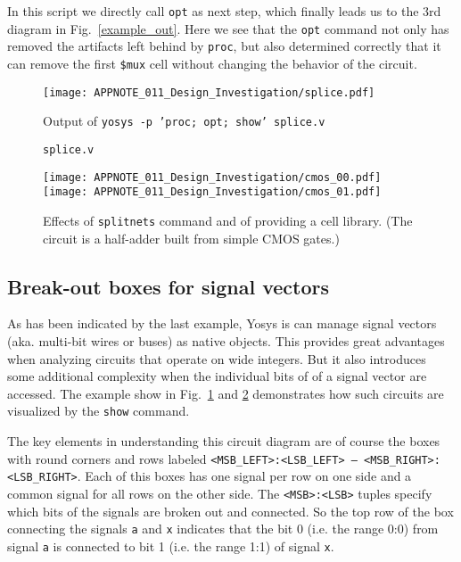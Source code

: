 \documentclass[9pt,technote,a4paper]{IEEEtran}
\begin{document}
\medskip

In this script we directly call {\tt opt} as next step, which finally leads us to
the 3rd diagram in Fig.~\ref{example_out}. Here we see that the {\tt opt} command
not only has removed the artifacts left behind by {\tt proc}, but also determined
correctly that it can remove the first {\tt \$mux} cell without changing the behavior
of the circuit.

\begin{figure}[b!]
\texttt{[image: APPNOTE\_011\_Design\_Investigation/splice.pdf]}
\caption{Output of {\tt yosys -p 'proc; opt; show' splice.v}}
\label{splice_dia}
\end{figure}

\begin{figure}[b!]

\caption{\tt splice.v}
\label{splice_src}
\end{figure}

\begin{figure}[t!]
\texttt{[image: APPNOTE\_011\_Design\_Investigation/cmos\_00.pdf]}
\texttt{[image: APPNOTE\_011\_Design\_Investigation/cmos\_01.pdf]}
\caption{Effects of {\tt splitnets} command and of providing a cell library. (The
circuit is a half-adder built from simple CMOS gates.)}
\label{splitnets_libfile}
\end{figure}

\subsection{Break-out boxes for signal vectors}

As has been indicated by the last example, Yosys is can manage signal vectors (aka.
multi-bit wires or buses) as native objects. This provides great advantages
when analyzing circuits that operate on wide integers. But it also introduces
some additional complexity when the individual bits of of a signal vector
are accessed. The example show in Fig.~\ref{splice_dia} and \ref{splice_src}
demonstrates how such circuits are visualized by the {\tt show} command.

The key elements in understanding this circuit diagram are of course the boxes
with round corners and rows labeled {\tt <MSB\_LEFT>:<LSB\_LEFT> -- <MSB\_RIGHT>:<LSB\_RIGHT>}.
Each of this boxes has one signal per row on one side and a common signal for all rows on the
other side. The {\tt <MSB>:<LSB>} tuples specify which bits of the signals are broken out
and connected. So the top row of the box connecting the signals {\tt a} and {\tt x} indicates
that the bit 0 (i.e. the range 0:0) from signal {\tt a} is connected to bit 1 (i.e. the range
1:1) of signal {\tt x}.
\end{document}
